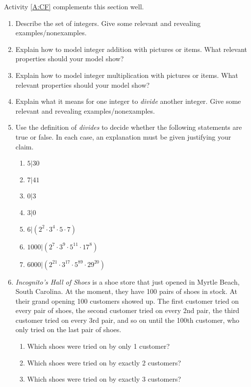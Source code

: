 \begin{activitynote}
Activity \ref{A:CF} complements this section well.  %
\end{activitynote}


\newpage


\begin{problems}
\begin{enumerate}
\item Describe the set of integers. Give some relevant and revealing
  examples/nonexamples.
\item Explain how to model integer addition with pictures or
  items. What relevant properties should your model show?
\item Explain how to model integer multiplication with pictures or
  items. What relevant properties should your model show?
\item Explain what it means for one integer to \textit{divide} another
  integer. Give some relevant and revealing examples/nonexamples.
\item Use the definition of \textit{divides} to decide whether the
  following statements are true or false. In each case, an explanation must 
be given justifying your claim.
\begin{enumerate}
\item $5|30$
\item $7|41$
\item $0|3$
\item $3|0$
\item $6|(2^2\cdot 3^4\cdot 5 \cdot 7)$
\item $1000|(2^7\cdot 3^9\cdot 5^{11}\cdot 17^8)$
\item $6000|(2^{21}\cdot 3^{17}\cdot 5^{89}\cdot 29^{20})$
\end{enumerate}
\item \textit{Incognito's Hall of Shoes} is a shoe store that just
  opened in Myrtle Beach, South Carolina. At the moment, they have 100
  pairs of shoes in stock. At their grand opening 100 customers showed
  up. The first customer tried on every pair of shoes, the second
  customer tried on every 2nd pair, the third customer tried on every
  3rd pair, and so on until the 100th customer, who only tried on the
  last pair of shoes.
\begin{enumerate}
\item Which shoes were tried on by only 1 customer?
\item Which shoes were tried on by exactly 2 customers?
\item Which shoes were tried on by exactly 3 customers?

\end{enumerate}
\end{enumerate}
\end{problems}
